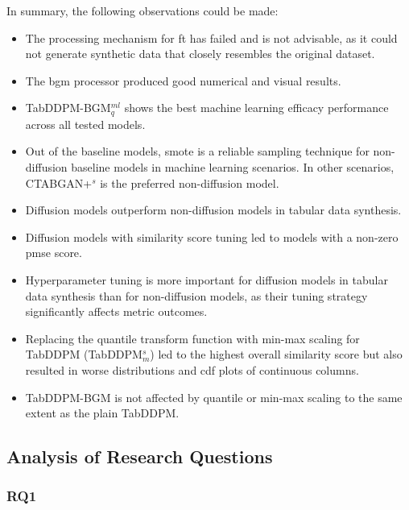 In summary, the following observations could be made:

\begin{itemize}
	\item The processing mechanism for \gls{ft} has failed and is not advisable, as it could not generate synthetic data that closely resembles the original dataset.
	\item The \gls{bgm} processor produced good numerical and visual results.
	\item TabDDPM-BGM$^{ml}_q$ shows the best machine learning efficacy performance across all tested models.
	\item Out of the baseline models, \gls{smote} is a reliable sampling technique for non-diffusion baseline models in machine learning scenarios.
	      In other scenarios, CTABGAN+$^{s}$ is the preferred non-diffusion \gls{model}.
	\item Diffusion models outperform non-diffusion models in tabular data synthesis.
	\item Diffusion models with similarity score tuning led to models with a non-zero \gls{pmse} score.
	\item Hyperparameter tuning is more important for diffusion models in tabular data synthesis than for non-diffusion models, as their tuning strategy significantly affects metric outcomes.
	\item Replacing the quantile transform function with min-max scaling for TabDDPM (TabDDPM$^{s}_m$) led to the highest overall similarity score but also resulted in worse distributions and \gls{cdf} plots of continuous columns.
	\item TabDDPM-BGM is not affected by quantile or min-max scaling to the same extent as the plain TabDDPM.
\end{itemize}
\newpage

\subsection*{Analysis of Research Questions}

\subsubsection{RQ1}

